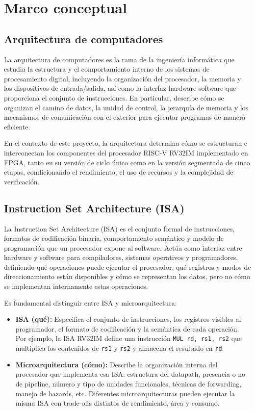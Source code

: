 \section{Marco conceptual}


\subsection{Arquitectura de computadores}

La arquitectura de computadores es la rama de la ingeniería informática que estudia la estructura y el comportamiento interno de los sistemas de procesamiento digital, incluyendo la organización del procesador, la memoria y los dispositivos de entrada/salida, así como la interfaz hardware-software que proporciona el conjunto de instrucciones. En particular, describe cómo se organizan el camino de datos, la unidad de control, la jerarquía de memoria y los mecanismos de comunicación con el exterior para ejecutar programas de manera eficiente.\parencite{Patterson2017Computer}

En el contexto de este proyecto, la arquitectura determina cómo se estructuran e interconectan los componentes del procesador RISC-V RV32IM implementado en FPGA, tanto en su versión de ciclo único como en la versión segmentada de cinco etapas, condicionando el rendimiento, el uso de recursos y la complejidad de verificación.


\subsection{Instruction Set Architecture (ISA)}

La Instruction Set Architecture (ISA) es el conjunto formal de instrucciones, formatos de codificación binaria, comportamiento semántico y modelo de programación que un procesador expone al software. Actúa como interfaz entre hardware y software para compiladores, sistemas operativos y programadores, definiendo qué operaciones puede ejecutar el procesador, qué registros y modos de direccionamiento están disponibles y cómo se representan los datos, pero no cómo se implementan internamente estas operaciones.\parencite{RISCV2019Manual,Patterson2017Computer}

Es fundamental distinguir entre ISA y microarquitectura:
\begin{itemize}
  \item \textbf{ISA (qué):} Especifica el conjunto de instrucciones, los registros visibles al programador, el formato de codificación y la semántica de cada operación. Por ejemplo, la ISA RV32IM define una instrucción \texttt{MUL rd, rs1, rs2} que multiplica los contenidos de \texttt{rs1} y \texttt{rs2} y almacena el resultado en \texttt{rd}.
  \item \textbf{Microarquitectura (cómo):} Describe la organización interna del procesador que implementa esa ISA: estructura del datapath, presencia o no de pipeline, número y tipo de unidades funcionales, técnicas de forwarding, manejo de hazards, etc. Diferentes microarquitecturas pueden ejecutar la misma ISA con trade-offs distintos de rendimiento, área y consumo.
\end{itemize}



